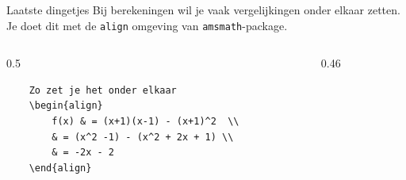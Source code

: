 \begin{frame}[fragile]{Laatste dingetjes} %
Bij berekeningen wil je vaak vergelijkingen onder elkaar zetten. Je doet dit 
met de \texttt{align} omgeving van \texttt{amsmath}-package. 
\begin{columns}[t]
    \begin{column}{0.5\textwidth}
    \begin{verbatim}
    Zo zet je het onder elkaar
    \begin{align}
        f(x) & = (x+1)(x-1) - (x+1)^2  \\
        & = (x^2 -1) - (x^2 + 2x + 1) \\
        & = -2x - 2
    \end{align}
    \end{verbatim}
    \par
\end{column}

\begin{column}{0.46\textwidth}
    \vspace{1mm}
\end{column}
\end{columns}
\end{frame}